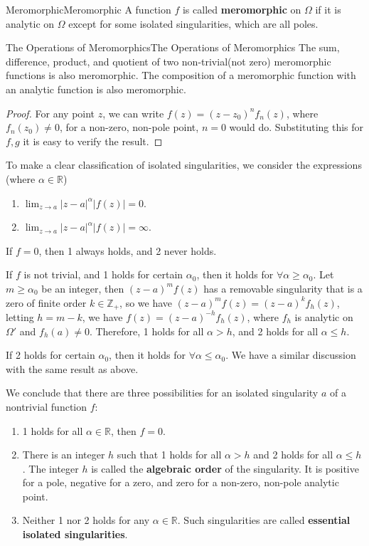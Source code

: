 \documentclass[../main.tex]{subfiles}
\begin{document}
\begin{definition}{Meromorphic}{Meromorphic}
	A function $f$ is called \textbf{meromorphic} on $\Omega$ if it is analytic on $\Omega$ except for some isolated singularities, which are all poles.
\end{definition}

\begin{proposition}{The Operations of Meromorphics}{The Operations of Meromorphics}
	The sum, difference, product, and quotient of two non-trivial(not zero) meromorphic functions is also meromorphic. The composition of a meromorphic function with an analytic function is also meromorphic.
\end{proposition}

\begin{proof}
	For any point $z$, we can write $f(z) = (z-z_0)^n f_n(z)$, where $f_n(z_0)\neq 0$, for a non-zero, non-pole point, $n=0$ would do. Substituting this for $f,g$ it is easy to verify the result.
\end{proof}

To make a clear classification of isolated singularities, we consider the expressions (where $\alpha\in \mathbb{R}$)
\begin{enumerate}
\item $\displaystyle \lim_{z \to a} \left|z-a\right|^{\alpha}\left|f(z)\right| = 0$.
\item $\displaystyle \lim_{z \to a} \left|z-a\right|^{\alpha}\left|f(z)\right| = \infty$.
\end{enumerate}

If $f=0$, then 1 always holds, and 2 never holds.

If $f$ is not trivial, and 1 holds for certain $\alpha_0$, then it holds for $\forall \alpha\geq \alpha_0$. Let $m\geq \alpha_0$ be an integer, then $(z-a)^mf(z)$ has a removable singularity that is a zero of finite order $k\in \mathbb{Z}_+$, so we have $(z-a)^mf(z) = (z-a)^kf_h(z)$, letting $h = m-k$, we have $f(z) = (z-a)^{-h} f_h(z)$, where $f_h$ is analytic on $\Omega'$ and $f_h(a)\neq 0$. Therefore, 1 holds for all $\alpha>h$, and 2 holds for all $\alpha\leq h$.

If 2 holds for certain $\alpha_0$, then it holds for $\forall \alpha\leq \alpha_0$. We have a similar discussion with the same result as above.

We conclude that there are three possibilities for an isolated singularity $a$ of a nontrivial function $f$:
\begin{enumerate}[label=(\roman*)]
	\item 1 holds for all $\alpha\in \mathbb{R}$, then $f=0$.
	\item There is an integer $h$ such that 1 holds for all $\alpha>h$ and 2 holds for all $\alpha\leq h$. The integer $h$ is called the \textbf{algebraic order} of the singularity. It is positive for a pole, negative for a zero, and zero for a non-zero, non-pole analytic point.
	\item Neither 1 nor 2 holds for any $\alpha\in \mathbb{R}$. Such singularities are called \textbf{essential isolated singularities}.
\end{enumerate}
\end{document}

